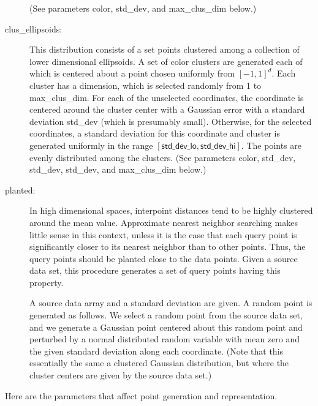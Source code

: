 \documentclass[11pt]{article}		%
\begin{document}
\begin{description}
	(See parameters \textsf{color}, \textsf{std\_dev}, and \textsf{max\_clus\_dim}
	below.)
\item[\hbox{\sf clus\_ellipsoids:}] 
	This distribution consists of a set points clustered among
	a collection of lower dimensional ellipsoids.  A set of \textsf{color}
	clusters are generated each of which is centered about a point
	chosen uniformly from $[-1,1]^d$.  Each cluster has a dimension,
	which is selected randomly from 1 to \textsf{max\_clus\_dim}.
	For each of the unselected coordinates, the coordinate is
	centered around the cluster center with a Gaussian error with
	a standard deviation \textsf{std\_dev} (which is presumably small).
	Otherwise, for the selected coordinates, a standard deviation
	for this coordinate and cluster is generated uniformly in the
	range $[\textsf{std\_dev\_lo}, \textsf{std\_dev\_hi}]$.  The points
	are evenly distributed among the clusters.  (See parameters
	\textsf{color}, \textsf{std\_dev}, \textsf{std\_dev}, \textsf{std\_dev},
	and \textsf{max\_clus\_dim} below.)
\item[\hbox{\sf planted:}] 
	In high dimensional spaces, interpoint distances tend to be
	highly clustered around the mean value.  Approximate nearest
	neighbor searching makes little sense in this context, unless it
	is the case that each query point is significantly closer to its
	nearest neighbor than to other points.  Thus, the query points
	should be planted close to the data points. Given a source data
	set, this procedure generates a set of query points having this
	property.

	A source data array and a standard deviation are given.  A
	random point is generated as follows.  We select a random point
	from the source data set, and we generate a Gaussian point
	centered about this random point and perturbed by a normal
	distributed random variable with mean zero and the given
	standard deviation along each coordinate.  (Note that this
	essentially the same a clustered Gaussian distribution, but
	where the cluster centers are given by the source data set.)
\end{description}

\noindent
Here are the parameters that affect point generation and representation.
\end{document}
